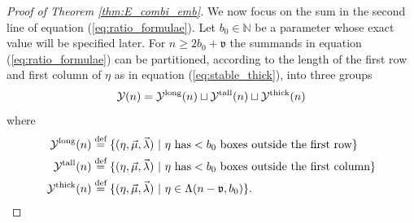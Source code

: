 \documentclass{amsart}
\newcommand{\defeq}{\stackrel{\tn{def}}{=}}
\newcommand{\tn}{\textnormal}
\begin{document}
\begin{proof}[Proof of Theorem \ref{thm:E_combi_emb}]
We now focus on the sum in the second line of equation (\ref{eq:ratio_formulae}). Let $b_0\in\mathbb{N}$ be a parameter whose exact value will be specified later. For $n\geqslant2b_0+\mathfrak{v}$ the summands in equation (\ref{eq:ratio_formulae}) can be partitioned, according to the length of the first row and first column of $\eta$ as in equation (\ref{eq:stable_thick}), into three groups
\begin{equation*}
\mathcal{Y}(n)=\mathcal{Y}^\tn{long}(n)\sqcup\mathcal{Y}^\tn{tall}(n)\sqcup\mathcal{Y}^\tn{thick}(n)
\end{equation*}
where
\begin{align*}
\mathcal{Y}^\tn{long}(n)&\defeq\{(\eta,\vec\mu,\vec\lambda)\ |\ \eta\text{ has}<b_0\text{ boxes outside the first row}\}\\
\mathcal{Y}^\tn{tall}(n)&\defeq\{(\eta,\vec\mu,\vec\lambda)\ |\ \eta\text{ has}<b_0\text{ boxes outside the first column}\}\\
\mathcal{Y}^\tn{thick}(n)&\defeq\{(\eta,\vec\mu,\vec\lambda)\ |\ \eta\in\Lambda(n-\mathfrak{v},b_0)\}.
\end{align*}


\end{proof}
\end{document}
